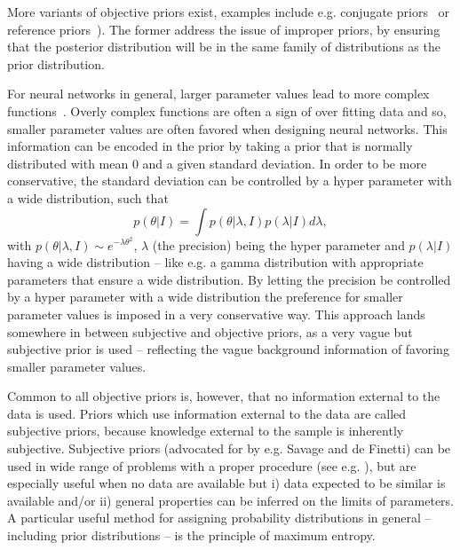 More variants of objective priors exist, examples include e.g. conjugate priors~\citep{Saw1961} or reference priors~\citep{Bernardo1979}). The former address the issue of improper priors, by ensuring that the posterior distribution will be in the same family of distributions as the prior distribution.
\begin{example}
	For neural networks in general, larger parameter values lead to more complex functions~\citep{Goodfellow2016}. Overly complex functions are often a sign of over fitting data and so, smaller parameter values are often favored when designing neural networks. This information can be encoded in the prior by taking a prior that is normally distributed with mean $0$ and a given standard deviation. In order to be more conservative, the standard deviation can be controlled by a hyper parameter with a wide distribution, such that
	\begin{equation}
		p(\theta|I)=\int p(\theta|\lambda,I)p(\lambda|I)d\lambda,
	\end{equation}
	with $p(\theta|\lambda,I)\sim e^{-\lambda\theta^2}$, $\lambda$ (the precision) being the hyper parameter and $p(\lambda|I)$ having a wide distribution -- like e.g. a gamma distribution with appropriate parameters that ensure a wide distribution. By letting the precision be controlled by a hyper parameter with a wide distribution the preference for smaller parameter values is imposed in a very conservative way. This approach lands somewhere in between subjective and objective priors, as a very vague but subjective prior is used -- reflecting the vague background information of favoring smaller parameter values.
\end{example}
Common to all objective priors is, however, that no information external to the data is used. Priors which use information external to the data are called subjective priors, because knowledge external to the sample is inherently subjective. Subjective priors (advocated for by e.g. Savage and de Finetti) can be used in wide range of problems with a proper procedure (see e.g. \citealt{Garthwaite2005}), but are especially useful when no data are available but i) data expected to be similar is available and/or ii) general properties can be inferred on the limits of parameters. A particular useful method for assigning probability distributions in general -- including prior distributions -- is the principle of maximum entropy.